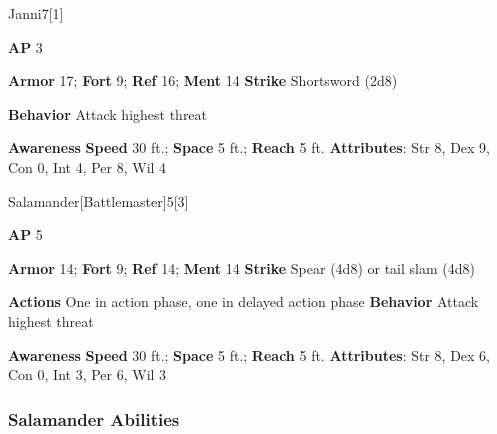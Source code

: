 \begin{monsection}{Janni}{7}[1]
\vspace{-1em}\vspace{-1em}
\begin{spellcontent}
\begin{spelltargetinginfo}
{\textbf{AP} 3}

\pari \textbf{Armor} 17;
\textbf{Fort} 9;
\textbf{Ref} 16;
\textbf{Ment} 14
\pari \textbf{Strike} Shortsword  (2d8)



\pari \textbf{Behavior} Attack highest threat
\end{spelltargetinginfo}
\end{spellcontent}

\begin{monsterfooter}
\pari \textbf{Awareness} 
\pari \textbf{Speed} 30 ft.;
\textbf{Space} 5 ft.;
\textbf{Reach} 5 ft.
\pari \textbf{Attributes}:
Str 8,
Dex 9,
Con 0,
Int 4,
Per 8,
Wil 4
\end{monsterfooter}
\end{monsection}

\begin{monsection}{Salamander}[Battlemaster]{5}[3]
\vspace{-1em}\vspace{-1em}
\begin{spellcontent}
\begin{spelltargetinginfo}
{\textbf{AP} 5}

\pari \textbf{Armor} 14;
\textbf{Fort} 9;
\textbf{Ref} 14;
\textbf{Ment} 14
\pari \textbf{Strike} Spear  (4d8) or tail slam  (4d8)


\pari \textbf{Actions} One in action phase, one in delayed action phase
\pari \textbf{Behavior} Attack highest threat
\end{spelltargetinginfo}
\end{spellcontent}

\begin{monsterfooter}
\pari \textbf{Awareness} 
\pari \textbf{Speed} 30 ft.;
\textbf{Space} 5 ft.;
\textbf{Reach} 5 ft.
\pari \textbf{Attributes}:
Str 8,
Dex 6,
Con 0,
Int 3,
Per 6,
Wil 3
\end{monsterfooter}
\end{monsection}


\subsubsection{Salamander Abilities}


